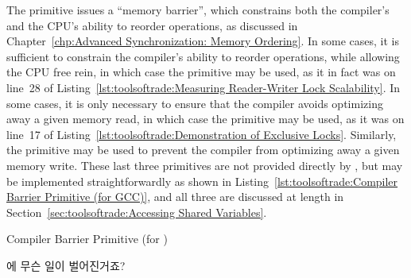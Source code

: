 The  primitive issues a ``memory barrier'',
which constrains both the compiler's and the CPU's ability to reorder
operations, as discussed in
Chapter~\ref{chp:Advanced Synchronization: Memory Ordering}.
In some cases, it is sufficient to constrain the compiler's ability
to reorder operations, while allowing the CPU free rein, in which
case the  primitive may be used, as it in fact was
on line~28 of
Listing~\ref{lst:toolsoftrade:Measuring Reader-Writer Lock Scalability}.
In some cases, it is only necessary to ensure that the compiler
avoids optimizing away a given memory read, in which case the
 primitive may be used, as it was on line~17 of
Listing~\ref{lst:toolsoftrade:Demonstration of Exclusive Locks}.
Similarly, the  primitive may be used to prevent the
compiler from optimizing away a given memory write.
These last three primitives are not provided directly by \GCC,
but may be implemented straightforwardly as shown in
Listing~\ref{lst:toolsoftrade:Compiler Barrier Primitive (for GCC)},
and all three are discussed at length in
Section~\ref{sec:toolsoftrade:Accessing Shared Variables}.
\fi

\begin{listing}[tb]

\caption{Compiler Barrier Primitive (for \GCC)}
\label{lst:toolsoftrade:Compiler Barrier Primitive (for GCC)}
\end{listing}

\QuickQuiz{}
	 에 무슨 일이 벌어진거죠?
	\iffalse

